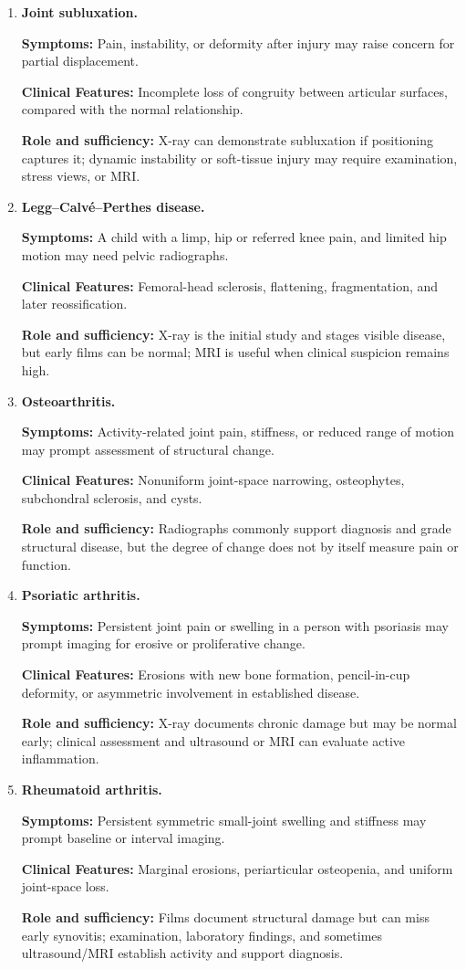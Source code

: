 \begin{enumerate}[leftmargin=*,itemsep=0.45em,topsep=0.4em]
\item \textbf{Joint subluxation.}\par\noindent\textbf{Symptoms:} Pain, instability, or deformity after injury may raise concern for partial displacement.\par\noindent\textbf{Clinical Features:} Incomplete loss of congruity between articular surfaces, compared with the normal relationship.\par\noindent\textbf{Role and sufficiency:} X-ray can demonstrate subluxation if positioning captures it; dynamic instability or soft-tissue injury may require examination, stress views, or MRI.
\item \textbf{Legg--Calv\'e--Perthes disease.}\par\noindent\textbf{Symptoms:} A child with a limp, hip or referred knee pain, and limited hip motion may need pelvic radiographs.\par\noindent\textbf{Clinical Features:} Femoral-head sclerosis, flattening, fragmentation, and later reossification.\par\noindent\textbf{Role and sufficiency:} X-ray is the initial study and stages visible disease, but early films can be normal; MRI is useful when clinical suspicion remains high.
\item \textbf{Osteoarthritis.}\par\noindent\textbf{Symptoms:} Activity-related joint pain, stiffness, or reduced range of motion may prompt assessment of structural change.\par\noindent\textbf{Clinical Features:} Nonuniform joint-space narrowing, osteophytes, subchondral sclerosis, and cysts.\par\noindent\textbf{Role and sufficiency:} Radiographs commonly support diagnosis and grade structural disease, but the degree of change does not by itself measure pain or function.
\item \textbf{Psoriatic arthritis.}\par\noindent\textbf{Symptoms:} Persistent joint pain or swelling in a person with psoriasis may prompt imaging for erosive or proliferative change.\par\noindent\textbf{Clinical Features:} Erosions with new bone formation, pencil-in-cup deformity, or asymmetric involvement in established disease.\par\noindent\textbf{Role and sufficiency:} X-ray documents chronic damage but may be normal early; clinical assessment and ultrasound or MRI can evaluate active inflammation.
\item \textbf{Rheumatoid arthritis.}\par\noindent\textbf{Symptoms:} Persistent symmetric small-joint swelling and stiffness may prompt baseline or interval imaging.\par\noindent\textbf{Clinical Features:} Marginal erosions, periarticular osteopenia, and uniform joint-space loss.\par\noindent\textbf{Role and sufficiency:} Films document structural damage but can miss early synovitis; examination, laboratory findings, and sometimes ultrasound/MRI establish activity and support diagnosis.

\end{enumerate}
